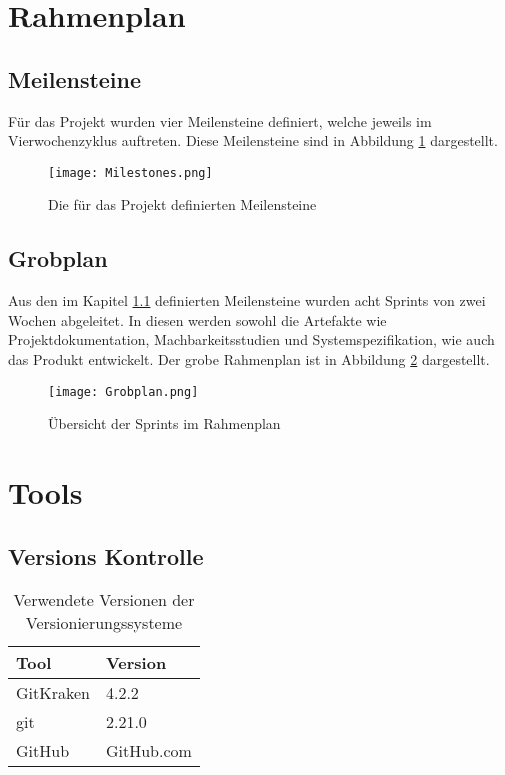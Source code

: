 \section{Rahmenplan}
\subsection{Meilensteine}
\label{ssec:Meilensteine}
Für das Projekt wurden vier Meilensteine definiert, welche jeweils im Vierwochenzyklus auftreten. Diese Meilensteine sind in Abbildung \ref{fig:Milestones} dargestellt.

\begin{figure}[h!]
	\centering
	\texttt{[image: Milestones.png]}
	\caption{Die für das Projekt definierten Meilensteine}
	\label{fig:Milestones}
\end{figure}

\subsection{Grobplan}

Aus den im Kapitel \ref{ssec:Meilensteine} definierten Meilensteine wurden acht Sprints von zwei Wochen abgeleitet. In diesen werden sowohl die Artefakte wie Projektdokumentation, Machbarkeitsstudien und Systemspezifikation, wie auch das Produkt entwickelt. Der grobe Rahmenplan ist in Abbildung \ref{fig:Rahmenplan_1} dargestellt.

\begin{figure}[h!]
	\centering
	\texttt{[image: Grobplan.png]}
	\caption{Übersicht der Sprints im Rahmenplan}
	\label{fig:Rahmenplan_1}
\end{figure}

\newpage

\section{Tools}
\label{sec:Tools}

\subsection{Versions Kontrolle}
\begin{table}[h!]
	\begin{tabular}{p{} p{}}
		\hline
		\textbf{Tool} & \textbf{Version} \\
		\hline
		GitKraken & 4.2.2 \\
		\hline
		git & 2.21.0 \\
		\hline
		GitHub & GitHub.com \\
		\hline
	\end{tabular}
	\caption{Verwendete Versionen der Versionierungssysteme}
\end{table}

